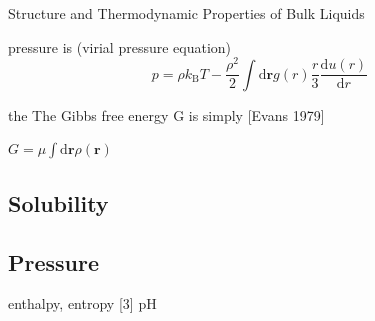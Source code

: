 Structure and Thermodynamic Properties of Bulk Liquids

pressure is (virial pressure equation) 
\begin{equation}
p=\rho k_{\mathrm{B}}T-\dfrac{\rho^{2}}{2}\int\mathrm{d}\mathbf{r}g(r)\frac{r}{3}\frac{\mathrm{d}u(r)}{\mathrm{d}r}
\end{equation}


the The Gibbs free energy G is simply {[}Evans 1979{]}

$G=\mu\int\mathrm{d}\mathbf{r}\rho(\mathbf{r})$


\subsection{Solubility}


\subsection{Pressure}

enthalpy, entropy {[}3{]} pH
